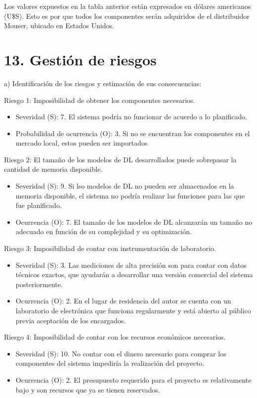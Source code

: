\documentclass[
11pt, %
]{plan}
\begin{document}
Los valores expuestos en la tabla anterior están expresados en dólares americanos (U\$S). Esto es por que todos los componentes serán adquiridos de el distribuidor Mouser, ubicado en Estados Unidos.

\section{13. Gestión de riesgos}
\label{sec:riesgos}

a) Identificación de los riesgos y estimación de sus consecuencias:

Riesgo 1: Imposibilidad de obtener los componentes necesarios.
\begin{itemize}
	\item Severidad (S): 7. El sistema podría no funcionar de acuerdo a lo planificado.
	\item Probabilidad de ocurrencia (O): 3. Si no se encuentran los componentes en el mercado local, estos pueden ser importados
\end{itemize}  

Riesgo 2: El tamaño de los modelos de DL desarrollados puede sobrepasar la cantidad de memoria disponible.
\begin{itemize}
	\item Severidad (S): 9. Si lso modelos de DL no pueden ser almacenados en la memoria disponible, el sistema no podría realizar las funciones para las que fue planificado.
	\item Ocurrencia (O): 7. El tamaño de los modelos de DL alcanzarán un tamaño no adecuado en función de su complejidad y su optimización.
\end{itemize}

Riesgo 3: Imposibilidad de contar con instrumentación de laboratorio.
\begin{itemize}
	\item Severidad (S): 3. Las mediciones de alta precisión son para contar con datos técnicos exactos, que ayudarán a desarrollar una versión comercial del sistema posteriormente.
	\item Ocurrencia (O): 2. En el lugar de residencia del autor se cuenta con un laboratorio de electrónica que funciona regularmente y está abierto al público previa aceptación de los encargados.
\end{itemize}

Riesgo 4: Imposibilidad de contar con los recursos económicos necesarios.
\begin{itemize}
	\item Severidad (S): 10. No contar con el dinero necesario para comprar los componentes del sistema impediría la realización del proyecto.
	\item Ocurrencia (O): 2. El presupuesto requerido para el proyecto es relativamente bajo y son recursos que ya se tienen reservados.
\end{itemize}
\end{document}
